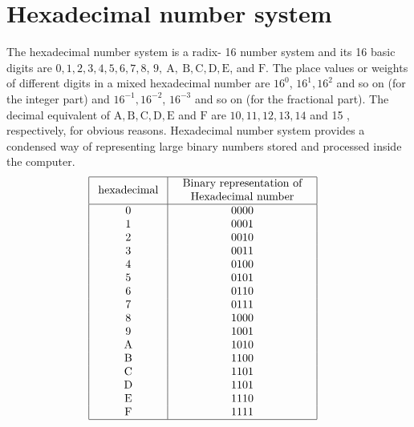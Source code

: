 \section{Hexadecimal number system}
The hexadecimal number system is a radix- 16 number system and its 16 basic digits are $0,1,2,3,4,5,6,7,8$, $9, \mathrm{~A}, \mathrm{~B}, \mathrm{C}, \mathrm{D}, \mathrm{E}$, and $\mathrm{F}$. The place values or weights of different digits in a mixed hexadecimal number are $16^{0}$, $16^{1}, 16^{2}$ and so on (for the integer part) and $16^{-1}, 16^{-2}$, $16^{-3}$ and so on (for the fractional part). The decimal equivalent of $\mathrm{A}, \mathrm{B}, \mathrm{C}, \mathrm{D}, \mathrm{E}$ and $\mathrm{F}$ are $10,11,12,13,14$ and 15 , respectively, for obvious reasons. Hexadecimal number system provides a condensed way of representing large binary numbers stored and processed inside the computer. 
\renewcommand*{\arraystretch}{1.2}
$$\begin{aligned}
&\begin{array}{|c|c|}
\hline \text { hexadecimal } & \begin{array}{c}
\text { Binary representation of } \\
\text { Hexadecimal number }
\end{array} \\
\hline 0 & 0000 \\
1 & 0001 \\
2 & 0010 \\
3 & 0011 \\
4 & 0100 \\
5 & 0101 \\
6 & 0110 \\
7 & 0111 \\
8 & 1000 \\
9 & 1001 \\
\text { A } & 1010 \\
\text { B } & 1100 \\
\text { C } & 1101 \\
\text { D } & 1101 \\
\text { E } & 1110 \\
\text { F } & 1111 \\
\hline
\end{array}
\end{aligned}$$
